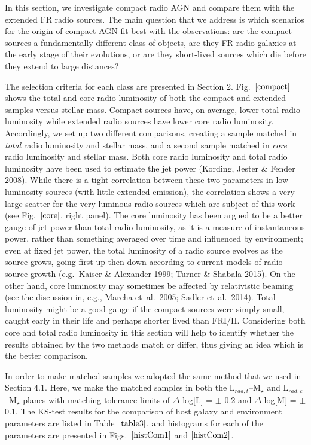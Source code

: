 \documentclass[usenatbib]{mn2e}
\begin{document}
In this section, we investigate compact radio AGN and compare them with
the extended FR radio sources. The main question that we address is which
scenarios for the origin of compact AGN fit best with the observations:
are the compact sources a fundamentally different class of objects, are
they FR radio galaxies at the early stage of their evolutions, or are they
short-lived sources which die before they extend to large distances?

The selection criteria for each class are presented in Section 2.  Fig.~$\ref{compact}$
shows the total and core radio luminosity of both the compact and extended
samples versus stellar mass. Compact sources have, on average, lower total
radio luminosity while extended radio sources have lower core radio
luminosity. Accordingly, we set up two different comparisons, creating a
sample matched in {\it total} radio luminosity and stellar mass, and a
second sample matched in {\it core} radio luminosity and stellar
mass. Both core radio luminosity and total radio luminosity have been used
to estimate the jet power (Kording, Jester \& Fender 2008). While there is
a tight correlation between these two parameters in low luminosity sources
(with little extended emission), the correlation shows a very large
scatter for the very luminous radio sources which are subject of this work
(see Fig.~$\ref{core}$, right panel). The core luminosity has been argued to be a
better gauge of jet power than total radio luminosity, as it is a measure
of instantaneous power, rather than something averaged over time and
influenced by environment; even at fixed jet power, the total luminosity
of a radio source evolves as the source grows, going first up then down
according to current models of radio source growth (e.g.\ Kaiser \&
Alexander 1999; Turner \& Shabala 2015).  On the other hand, core luminosity may sometimes be affected 
by relativistic beaming (see the discussion in, e.g., Marcha et~al.\ 2005; Sadler et~al.\ 2014). 
Total luminosity might be a good gauge if the compact sources were
simply small, caught early in their life and perhaps shorter lived than
FRI/II. Considering both core and total radio luminosity in this section
will help to identify whether the results obtained by the two methods
match or differ, thus giving an idea which is the better comparison.
 
In order to make matched samples we adopted the same method that we used
in Section 4.1. Here, we make the matched samples in both the
L$_{rad,t}$--M$_{\star}$ and L$_{rad,c}$--M$_{\star}$ planes with
matching-tolerance limits of $\Delta$ log[L] = $\pm$ 0.2 and $\Delta$
log[M] = $\pm$ 0.1.  The KS-test results for the comparison of host galaxy
and environment parameters are listed in Table~$\ref{table3}$, and
histograms for each of the parameters are presented in Figs.~$\ref{histCom1}$ and $\ref{histCom2}$.
\end{document}

